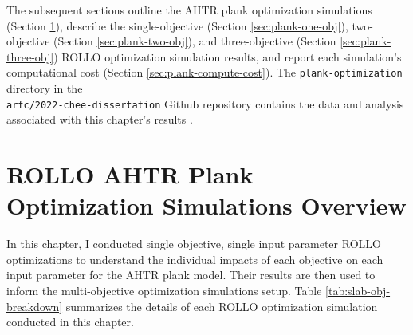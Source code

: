 The subsequent sections outline the \gls{AHTR} plank optimization simulations 
(Section \ref{sec:plank-overview}), describe the single-objective (Section 
\ref{sec:plank-one-obj}), two-objective (Section \ref{sec:plank-two-obj}), and 
three-objective (Section \ref{sec:plank-three-obj}) \gls{ROLLO} optimization 
simulation results, and report each simulation's computational cost 
(Section \ref{sec:plank-compute-cost}).
The \texttt{plank-optimization} directory in the \\ \texttt{arfc/2022-chee-dissertation} 
Github repository contains the data and analysis associated with this 
chapter's results \cite{chee_dissertation_2021}. 

\section{ROLLO AHTR Plank Optimization Simulations Overview}
\label{sec:plank-overview}
In this chapter, I conducted single objective, single input parameter 
\gls{ROLLO} optimizations to understand the individual impacts of each objective on 
each input parameter for the \gls{AHTR} plank model. 
Their results are then used to inform the multi-objective optimization simulations setup. 
Table \ref{tab:slab-obj-breakdown} summarizes the details of each \gls{ROLLO} 
optimization simulation conducted in this chapter.
